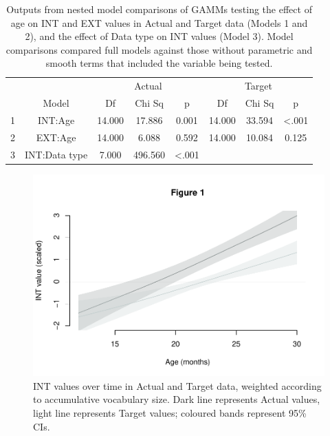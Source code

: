 \documentclass[
  man]{apa6}
\begin{document}
\begin{longtable}[t]{cccccccc}
\caption{\label{tab:table-GAMM-outputs}Outputs from nested model comparisons of GAMMs testing the effect of age on INT and EXT values in Actual and Target data (Models 1 and 2), and the effect of Data type on INT values (Model 3). Model comparisons compared full models against those without parametric and smooth terms that included the variable being tested.}\\
\toprule
\multicolumn{2}{c}{ } & \multicolumn{3}{c}{Actual} & \multicolumn{3}{c}{Target} \\
\cmidrule(l{3pt}r{3pt}){3-5} \cmidrule(l{3pt}r{3pt}){6-8}
  & Model & Df & Chi Sq & p & Df & Chi Sq & p\\
\midrule
1 & INT:Age & 14.000 & 17.886 & 0.001 & 14.000 & 33.594 & <.001\\
2 & EXT:Age & 14.000 & 6.088 & 0.592 & 14.000 & 10.084 & 0.125\\
3 & INT:Data type & 7.000 & 496.560 & <.001 &  &  & \\
\bottomrule
\end{longtable}

\begin{figure}
\centering
\includegraphics{PhonNetworksProj-revised_files/figure-latex/figure-GAMM-INT-1.pdf}
\caption{\label{fig:figure-GAMM-INT}INT values over time in Actual and Target data, weighted according to accumulative vocabulary size. Dark line represents Actual values, light line represents Target values; coloured bands represent 95\% CIs.}
\end{figure}
\end{document}
